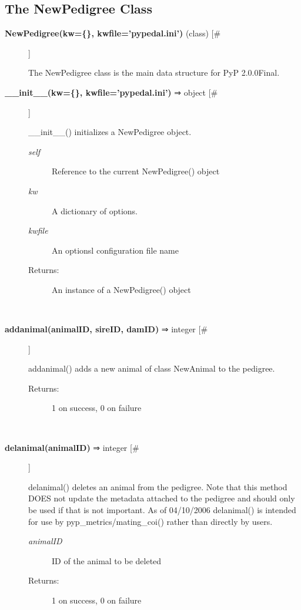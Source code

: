 \subsection*{The NewPedigree Class}
\begin{description}
\item[\textbf{NewPedigree(kw=\{\}, kwfile='pypedal.ini')} (class) [\#]
]
\par The NewPedigree class is the main data structure for PyP 2.0.0Final.

\item[\textbf{\_\_init\_\_(kw=\{\}, kwfile='pypedal.ini')} ⇒ object [\#]
]
\par \_\_init\_\_() initializes a NewPedigree object.
\begin{description}
\item[\textit{self}
]
Reference to the current NewPedigree() object
\item[\textit{kw}
]
A dictionary of options.
\item[\textit{kwfile}
]
An optionsl configuration file name
\item[Returns:
]
An instance of a NewPedigree() object
\end{description}\\

\item[\textbf{addanimal(animalID, sireID, damID)} ⇒ integer [\#]
]
\par addanimal() adds a new animal of class NewAnimal to the pedigree.
\begin{description}
\item[\textit{}
]

\item[Returns:
]
1 on success, 0 on failure
\end{description}\\

\item[\textbf{delanimal(animalID)} ⇒ integer [\#]
]
\par delanimal() deletes an animal from the pedigree. Note that this
method DOES not update the metadata attached to the pedigree
and should only be used if that is not important. As of 04/10/2006
delanimal() is intended for use by pyp\_metrics/mating\_coi() rather
than directly by users.
\begin{description}
\item[\textit{animalID}
]
ID of the animal to be deleted
\item[Returns:
]
1 on success, 0 on failure
\end{description}\\


\end{description}
